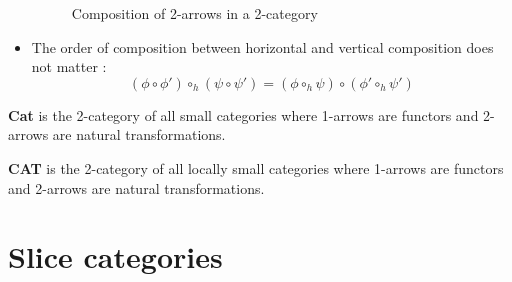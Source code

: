 \begin{defn}[2-category]
\begin{itemize}
\begin{figure}[h]
                  \caption{Composition of 2-arrows in a 2-category}
                  \label{fig:2-comp}
              \end{figure}
        \item The order of composition between horizontal and vertical composition does not matter : 
            $$(\phi\circ\phi')\circ_h(\psi\circ\psi') = (\phi\circ_h\psi)\circ(\phi'\circ_h\psi')$$
    \end{itemize}
\end{defn}




\begin{defn}[\bf Cat]
    \textbf{Cat}\label{nomencl:Cat} is the 2-category of all small categories where 1-arrows are functors and 2-arrows are natural transformations.
\end{defn}
\begin{defn}[\bf CAT]
    \textbf{CAT}\label{nomencl:CAT} is the 2-category of all locally small categories where 1-arrows are functors and 2-arrows are natural transformations.
\end{defn}

\section{Slice categories}

